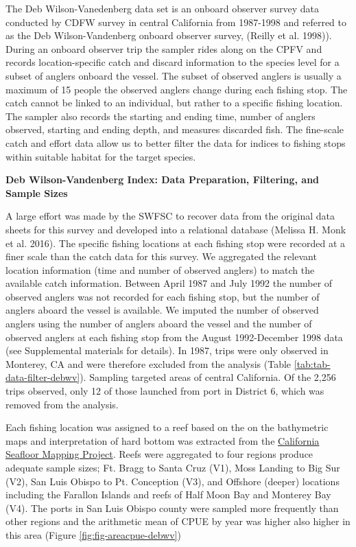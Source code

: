\documentclass[
  english,
  a4paper,
]{article}
\begin{document}
The Deb Wilson-Vanedenberg data set is an onboard observer survey data conducted
by CDFW survey in central California from 1987-1998 and referred to as the Deb
Wilson-Vandenberg onboard observer survey, (Reilly et al. 1998)). During an onboard
observer trip the sampler rides along on the CPFV and records location-specific
catch and discard information to the species level for a subset of anglers
onboard the vessel. The subset of observed anglers is usually a maximum of 15
people the observed anglers change during each fishing stop. The catch cannot be
linked to an individual, but rather to a specific fishing location. The sampler
also records the starting and ending time, number of anglers observed, starting
and ending depth, and measures discarded fish. The fine-scale catch and effort
data allow us to better filter the data for indices
to fishing stops within suitable habitat for the target species.

\textbf{Deb Wilson-Vandenberg Index: Data Preparation, Filtering, and Sample Sizes}

A large effort was made by the SWFSC to recover data from the original data
sheets for this survey and developed into a relational database (Melissa H. Monk et al. 2016).
The specific fishing locations at each fishing stop were recorded at a finer
scale than the catch data for this survey. We aggregated the relevant location
information (time and number of observed anglers) to match the available catch
information. Between April 1987 and July 1992 the number of observed anglers
was not recorded for each fishing stop, but the number of anglers aboard the
vessel is available. We imputed the number of observed anglers using the number
of anglers aboard the vessel and the number of observed anglers at each fishing
stop from the August 1992-December 1998 data (see Supplemental materials for
details). In 1987, trips were only observed in Monterey, CA and were therefore
excluded from the analysis (Table \ref{tab:tab-data-filter-debwv}). Sampling
targeted areas of central California. Of the 2,256 trips observed, only 12 of
those launched from port in District 6, which was removed from the analysis.

Each fishing location was assigned to a reef based on the on the bathymetric maps
and interpretation of hard bottom was extracted from
the \href{http://seafloor.otterlabs.org/index.html}{California Seafloor Mapping Project}.
Reefs were aggregated to four regions produce adequate sample sizes;
Ft. Bragg to Santa Cruz (V1), Moss Landing to Big Sur (V2), San Luis Obispo to
Pt. Conception (V3), and Offshore (deeper) locations including the Farallon
Islands and reefs of Half Moon Bay and Monterey Bay (V4). The ports in San
Luis Obispo county were sampled more frequently than other regions and the arithmetic
mean of CPUE by year was higher also higher in this area (Figure \ref{fig:fig-areacpue-debwv})
\end{document}
